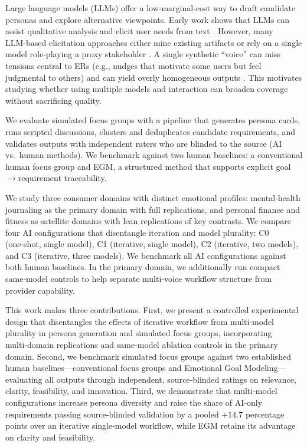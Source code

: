 \documentclass[acmsmall]{acmart}
\begin{document}
Large language models (LLMs) offer a low‑marginal‑cost way to draft candidate personas and explore alternative viewpoints. Early work shows that LLMs can assist qualitative analysis and elicit user needs from text \cite{bano2024large,hayes2025conversing,crocker2025proof,omizo2024automating}. However, many LLM‑based elicitation approaches either mine existing artifacts or rely on a single model role‑playing a proxy stakeholder \cite{bano2023ai,marques2024using,barros2025large}. A single synthetic “voice” can miss tensions central to ERs (e.g., nudges that motivate some users but feel judgmental to others) and can yield overly homogeneous outputs \cite{kung2023performance,lin2025leveraging}. This motivates studying whether using multiple models and interaction can broaden coverage without sacrificing quality.

We evaluate simulated focus groups with a pipeline that generates persona cards, runs scripted discussions, clusters and deduplicates candidate requirements, and validates outputs with independent raters who are blinded to the source (AI vs.\ human methods). We benchmark against two human baselines: a conventional human focus group and EGM, a structured method that supports explicit goal$\rightarrow$requirement traceability.

We study three consumer domains with distinct emotional profiles: mental‑health journaling as the primary domain with full replications, and personal finance and fitness as satellite domains with lean replications of key contrasts. We compare four AI configurations that disentangle iteration and model plurality: C0 (one‑shot, single model), C1 (iterative, single model), C2 (iterative, two models), and C3 (iterative, three models). We benchmark all AI configurations against both human baselines. In the primary domain, we additionally run compact same‑model controls to help separate multi‑voice workflow structure from provider capability.

This work makes three contributions. First, we present a controlled experimental design that disentangles the effects of iterative workflow from multi‑model plurality in persona generation and simulated focus groups, incorporating multi‑domain replications and same‑model ablation controls in the primary domain. Second, we benchmark simulated focus groups against two established human baselines---conventional focus groups and Emotional Goal Modeling---evaluating all outputs through independent, source‑blinded ratings on relevance, clarity, feasibility, and innovation. Third, we demonstrate that multi‑model configurations increase persona diversity and raise the share of AI‑only requirements passing source‑blinded validation by a pooled \(+14.7\) percentage points over an iterative single‑model workflow, while EGM retains its advantage on clarity and feasibility. 
\end{document}
